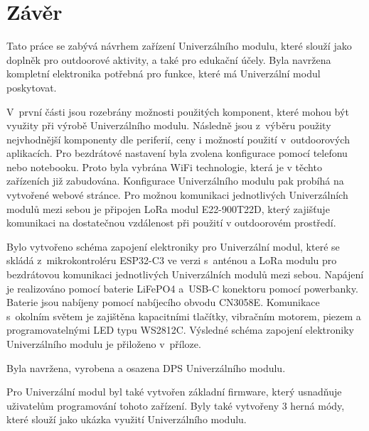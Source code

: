 \chapter*{Závěr}
{}
Tato práce se zabývá návrhem zařízení Univerzálního modulu, které slouží jako doplněk pro outdoorové aktivity, a také pro edukační účely. Byla navržena kompletní 
elektronika potřebná pro funkce, které má Univerzální modul poskytovat. 

V~první části jsou rozebrány možnosti použitých komponent, které mohou být využity při výrobě Univerzálního modulu. Následně jsou z~výběru použity 
nejvhodnější komponenty dle periferií, ceny i možností použití v~outdoorových aplikacích. Pro bezdrátové nastavení byla zvolena konfigurace pomocí telefonu nebo 
notebooku. Proto byla vybrána WiFi technologie, která je v těchto zařízeních již zabudována. Konfigurace Univerzálního modulu pak probíhá na vytvořené webové stránce. 
Pro možnou komunikaci jednotlivých Univerzálních modulů mezi sebou je připojen LoRa modul E22-900T22D, který zajišťuje komunikaci na dostatečnou vzdálenost při použití 
v outdoorovém prostředí. 

Bylo vytvořeno schéma zapojení elektroniky pro Univerzální modul, které se skládá z~mikrokontroléru ESP32-C3 ve verzi s~anténou a LoRa modulu pro 
bezdrátovou komunikaci jednotlivých Univerzálních modulů mezi sebou. Napájení je realizováno pomocí baterie LiFePO4 a~USB-C konektoru pomocí powerbanky. Baterie 
jsou nabíjeny pomocí nabíjecího obvodu CN3058E. Komunikace s~okolním světem je zajištěna kapacitními tlačítky, 
vibračním motorem, piezem a programovatelnými LED typu WS2812C. Výsledné schéma zapojení elektroniky Univerzálního modulu je přiloženo v~příloze. 

Byla navržena, vyrobena a osazena DPS Univerzálního modulu. 

Pro Univerzální modul byl také vytvořen základní firmware, který usnadňuje uživatelům programování tohoto zařízení. Byly také vytvořeny 3 herná módy, které slouží jako ukázka 
využití Univerzálního modulu. 

